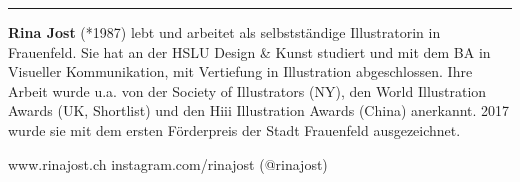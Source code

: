 \begin{center}\rule{0.5\linewidth}{0.5pt}\end{center}

\textbf{Rina Jost} (*1987) lebt und
arbeitet als selbstständige Illustratorin in Frauenfeld. Sie hat an der
HSLU Design \& Kunst studiert und mit dem BA in Visueller Kommunikation,
mit Vertiefung in Illustration abgeschlossen. Ihre Arbeit wurde u.a. von
der Society of Illustrators (NY), den World Illustration Awards (UK,
Shortlist) und den Hiii Illustration Awards (China) anerkannt. 2017
wurde sie mit dem ersten Förderpreis der Stadt Frauenfeld ausgezeichnet.

www.rinajost.ch\newline
instagram.com/rinajost (@rinajost)
